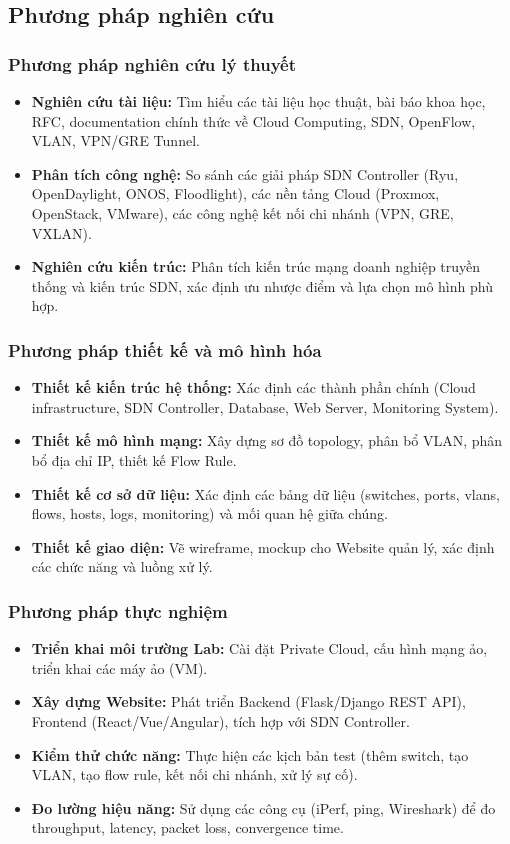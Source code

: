 \subsection{Phương pháp nghiên cứu}

\subsubsection{Phương pháp nghiên cứu lý thuyết}
\begin{itemize}
    \item \textbf{Nghiên cứu tài liệu:} Tìm hiểu các tài liệu học thuật, bài báo khoa học, RFC, documentation chính thức về Cloud Computing, SDN, OpenFlow, VLAN, VPN/GRE Tunnel.
    \item \textbf{Phân tích công nghệ:} So sánh các giải pháp SDN Controller (Ryu, OpenDaylight, ONOS, Floodlight), các nền tảng Cloud (Proxmox, OpenStack, VMware), các công nghệ kết nối chi nhánh (VPN, GRE, VXLAN).
    \item \textbf{Nghiên cứu kiến trúc:} Phân tích kiến trúc mạng doanh nghiệp truyền thống và kiến trúc SDN, xác định ưu nhược điểm và lựa chọn mô hình phù hợp.
\end{itemize}

\subsubsection{Phương pháp thiết kế và mô hình hóa}
\begin{itemize}
    \item \textbf{Thiết kế kiến trúc hệ thống:} Xác định các thành phần chính (Cloud infrastructure, SDN Controller, Database, Web Server, Monitoring System).
    \item \textbf{Thiết kế mô hình mạng:} Xây dựng sơ đồ topology, phân bổ VLAN, phân bổ địa chỉ IP, thiết kế Flow Rule.
    \item \textbf{Thiết kế cơ sở dữ liệu:} Xác định các bảng dữ liệu (switches, ports, vlans, flows, hosts, logs, monitoring) và mối quan hệ giữa chúng.
    \item \textbf{Thiết kế giao diện:} Vẽ wireframe, mockup cho Website quản lý, xác định các chức năng và luồng xử lý.
\end{itemize}

\subsubsection{Phương pháp thực nghiệm}
\begin{itemize}
    \item \textbf{Triển khai môi trường Lab:} Cài đặt Private Cloud, cấu hình mạng ảo, triển khai các máy ảo (VM).
    \item \textbf{Xây dựng Website:} Phát triển Backend (Flask/Django REST API), Frontend (React/Vue/Angular), tích hợp với SDN Controller.
    \item \textbf{Kiểm thử chức năng:} Thực hiện các kịch bản test (thêm switch, tạo VLAN, tạo flow rule, kết nối chi nhánh, xử lý sự cố).
    \item \textbf{Đo lường hiệu năng:} Sử dụng các công cụ (iPerf, ping, Wireshark) để đo throughput, latency, packet loss, convergence time.
\end{itemize}

